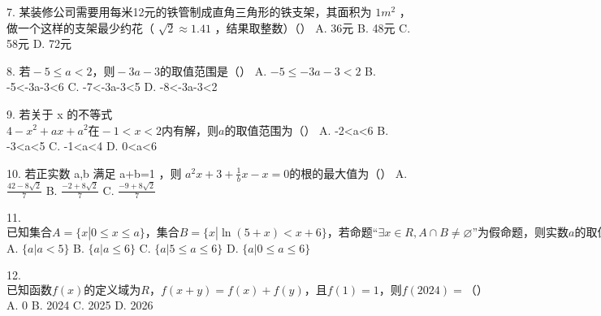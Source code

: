 7. 某装修公司需要用每米12元的铁管制成直角三角形的铁支架，其面积为 $1m^{2}$ ，做一个这样的支架最少约花（ $\sqrt{2}\approx1.41$ ，结果取整数）（）
A. 36元
B. 48元
C. 58元
D. 72元

8. $若 -5\leq a<2 ，则 -3a-3 的取值范围是（）$
A.  $-5\leq -3a-3<2 $
B.  -5<-3a-3<6 
C.  -7<-3a-3<5 
D.  -8<-3a-3<2 

9. 若关于 x 的不等式 $4-x^{2}+ax+a^{2} 在 -1<x<2 内有解，则 a 的取值范围为（）$
A.  -2<a<6 
B.  -3<a<5 
C.  -1<a<4 
D.  0<a<6 

10. 若正实数 a,b 满足 a+b=1 ，则 $a^{2}x+3+\frac{1}{b}x-x=0 的根的最大值为（）$
A.  $\frac{42-8\sqrt{2}}{7} $
B.  $\frac{-2+8\sqrt{2}}{7} $
C.  $\frac{-9+8\sqrt{2}}{7} $

11. $已知集合 A=\{ x|0\leq x\leq a\} ，集合 B=\{ x|\ln(5+x)<x+6\} ，若命题“ \exists x\in R,A\cap B\neq\varnothing ”为假命题，则实数 a 的取值范围为（）$
A.  $\{ a|a<5\} $
B.  $\{ a|a\leq6\}$ 
C.  $\{ a|5\leq a\leq6\} $
D.  $\{ a|0\leq a\leq6\} $

12. $已知函数 f(x) 的定义域为 R ， f(x+y)=f(x)+f(y) ，且 f(1)=1 ，则 f(2024)= （）$
A. 0
B. 2024
C. 2025
D. 2026